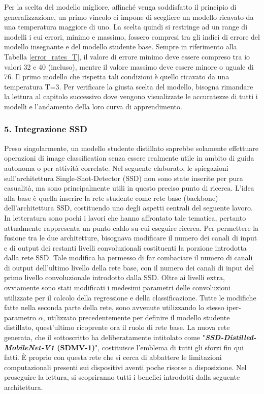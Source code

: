 Per la scelta del modello migliore, affinché venga soddisfatto il principio di generalizzazione, un primo vincolo ci impone di scegliere un modello ricavato da una temperatura maggiore di uno. La scelta quindi si restringe ad un range di modelli i cui errori, minimo e massimo, fossero compresi tra gli indici di errore del modello insegnante e del modello studente base. Sempre in riferimento alla Tabella \ref{error_rates_T}, il valore di errore minimo deve essere compreso tra io valori 32 e 40 (incluso), mentre il valore massimo deve essere minore o uguale di 76. Il primo modello che rispetta tali condizioni è quello ricavato da una temperatura T=3. Per verificare la giusta scelta del modello, bisogna rimandare la lettura al capitolo successivo dove vengono visualizzate le accuratezze di tutti i modelli e l'andamento della loro curva di apprendimento.

\subsubsection{5. Integrazione SSD}
Preso singolarmente, un modello studente distillato saprebbe solamente effettuare operazioni di image classification senza essere realmente utile in ambito di guida autonoma o per attività correlate. Nel seguente elaborato, le spiegazioni sull'architettura Single-Shot-Detector (SSD) non sono state inserite per pura casualità, ma sono principalmente utili in questo preciso punto di ricerca. L'idea alla base è quella inserire la rete studente come rete base (backbone) dell'architettura SSD, costituendo uno degli aspetti centrali del seguente lavoro. In letteratura sono pochi i lavori che hanno affrontato tale tematica, pertanto attualmente rappresenta un punto caldo su cui eseguire ricerca.
Per permettere la fusione tra le due architetture, bisognava modificare il numero dei canali di input e di output dei restanti livelli convoluzionali costituenti la porzione introdotta dalla rete SSD. Tale modifica ha permesso di far combaciare il numero di canali di output dell'ultimo livello della rete base, con il numero dei canali di input del primo livello convoluzionale introdotto dalla SSD. Oltre ai livelli extra, ovviamente sono stati modificati i medesimi parametri delle convoluzioni utilizzate per il calcolo della regressione e della classificazione. Tutte le modifiche fatte nella seconda parte della rete, sono avvenute utilizzando lo stesso iper-parametro $\alpha$, utilizzato precedentemente per definire il modello studente distillato, quest'ultimo ricoprente ora il ruolo di rete base. 
La nuova rete generata, che il sottoscritto ha deliberatamente intitolato come "{\bfseries{\emph{SSD-Distilled-MobileNet-V1} (SDMV-1)}}", costituisce l'emblema di tutti gli sforzi fin qui fatti. È proprio con questa rete che si cerca di abbattere le limitazioni computazionali presenti sui dispositivi aventi poche risorse a disposizione. Nel proseguire la lettura, si scopriranno tutti i benefici introdotti dalla seguente architettura.

